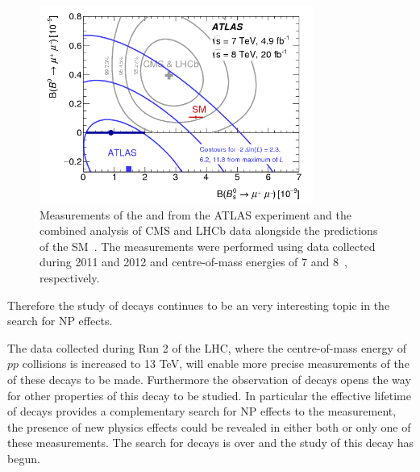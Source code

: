\begin{figure}[htbp]
    \centering
        \includegraphics[width=0.8\textwidth]{./Figs/Introduction/contour_plot.png}
        \caption{Measurements of the \bdmumu \BF and \bsmumu \BF from the ATLAS experiment and the combined analysis of CMS and LHCb data alongside the predictions of the SM~\cite{Aaboud:2016ire}. The measurements were performed using data collected during 2011 and 2012 and centre-of-mass energies of 7 and 8~\tev, respectively.}
        \label{fig:contour}
\end{figure}
Therefore the study of \bmumu decays continues to be an very interesting topic in the search for NP effects. 

The data collected during Run 2 of the LHC, where the centre-of-mass energy of $pp$ collisions is increased to 13 TeV, will enable more precise measurements of the \BFs of these decays to be made. 
Furthermore the observation of \bsmumu decays opens the way for other properties of this decay to be studied. In particular the effective lifetime of \bsmumu decays provides a complementary search for NP effects to the \BF measurement, the presence of new physics effects could be revealed in either both or only one of these measurements. The search for \bsmumu decays is over and the study of this decay has begun.



